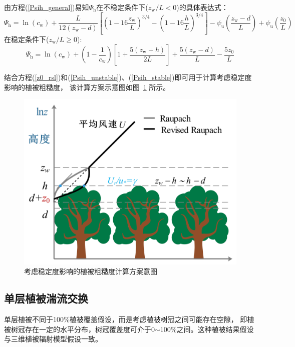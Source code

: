 由方程(\ref{Psih_general})易知$\Psi_{\mathrm{h}}$在不稳定条件下($z_{\mathrm{w}}/L < 0$)的具体表达式：
\begin{equation}\label{Psih_unstable}
  \Psi_{\mathrm{h}} = \ln \left(c_{\mathrm{w}}\right) + \frac{L}{12\left(z_{\mathrm{w}}-d\right)} \left[\left(1-16\frac{z_{\mathrm{w}}}{L}\right)^{3/4}
  - \left(1-16\frac{h}{L}\right)^{3/4} \right] - \psi_{\mathrm {u}} \left(\frac{z_{\mathrm{w}}-d}{L} \right) + \psi_{\mathrm {u}} \left(\frac{z_{\mathrm{0}}}{L} \right)
\end{equation}
在稳定条件下($z_{\mathrm{w}}/L \geqslant 0$):
\begin{equation}\label{Psih_stable}
  \Psi_{\mathrm{h}} = \ln \left(c_{\mathrm{w}}\right) + \left(1-\frac{1}{c_{\mathrm{w}}}\right) \left[1+\frac{5\left(z_{\mathrm{w}}+h\right)}{2L}\right]
  + \frac{5\left(z_{\mathrm{w}}-d\right)}{L} - \frac{5z_{0}}{L}
\end{equation}

结合方程(\ref{z0_rsl})和(\ref{Psih_unstable})、(\ref{Psih_stable})即可用于计算考虑稳定度影响的植被粗糙度，
该计算方案示意图如图~\ref{fig:修正Raupach粗糙度方案示意图} 所示。
{
  \begin{figure}[]
    \centering
    \includegraphics[scale=0.7]{Figures/地表湍流交换过程/修正Raupach粗糙度方案示意图.jpg}
    \caption{考虑稳定度影响的植被粗糙度计算方案意图}
    \label{fig:修正Raupach粗糙度方案示意图}
  \end{figure}
}


\subsection{单层植被湍流交换}\label{单层植被湍流交换}
单层植被不同于100\%植被覆盖假设，而是考虑植被树冠之间可能存在空隙，
即植被树冠存在一定的水平分布，树冠覆盖度可介于0$\sim$100\%之间。这种植被结果假设与三维植被辐射模型假设一致。



